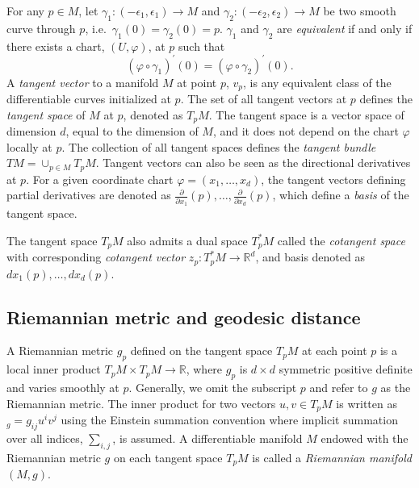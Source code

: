 \documentclass[11pt,a4paper,]{article}
\begin{document}
For any \(p \in M\), let
\(\gamma_1: (-\epsilon_1, \epsilon_1)\rightarrow M\) and
\(\gamma_2: (-\epsilon_2, \epsilon_2)\rightarrow M\) be two smooth curve
through \(p\), i.e.~\(\gamma_1(0) = \gamma_2(0) = p\). \(\gamma_1\) and
\(\gamma_2\) are \emph{equivalent} if and only if there exists a chart,
\((U,\varphi)\), at \(p\) such that \[
(\varphi \circ \gamma_1)^\prime(0) = (\varphi \circ \gamma_2)^\prime(0).
\] A \emph{tangent vector} to a manifold \(M\) at point \(p\), \(v_p\), is any
equivalent class of the differentiable curves initialized at \(p\). The
set of all tangent vectors at \(p\) defines the \emph{tangent space} of \(M\) at
\(p\), denoted as \(T_pM\). The tangent space is a vector space of dimension
\(d\), equal to the dimension of \(M\), and it does not depend on the chart
\(\varphi\) locally at \(p\). The collection of all tangent spaces defines
the \emph{tangent bundle} \(TM = \cup_{p \in M}T_pM\). Tangent vectors can also
be seen as the directional derivatives at \(p\). For a given coordinate
chart \(\varphi=(x_1,\dots,x_d)\), the tangent vectors defining partial
derivatives are denoted as
\(\frac{\partial}{\partial x_1}(p),\dots,\frac{\partial}{\partial x_d}(p)\),
which define a \emph{basis} of the tangent space.

The tangent space \(T_pM\) also admits a dual space \(T^*_pM\) called the
\emph{cotangent space} with corresponding \emph{cotangent vector}
\(z_p: T^*_pM \rightarrow \mathbb{R}^d\), and basis denoted as
\(dx_1(p),\dots,dx_d(p)\).

\hypertarget{riemannian-metric-and-geodesic-distance}{%
\subsection{Riemannian metric and geodesic distance}\label{riemannian-metric-and-geodesic-distance}}

A Riemannian metric \(g_p\) defined on the tangent space \(T_pM\) at each
point \(p\) is a local inner product
\(T_pM \times T_pM \rightarrow \mathbb{R}\), where \(g_p\) is \(d\times d\)
symmetric positive definite and varies smoothly at \(p\). Generally, we
omit the subscript \(p\) and refer to \(g\) as the Riemannian metric. The
inner product for two vectors \(u, v \in T_pM\) is written as
\(<u, v>_g = g_{ij}u^iv^j\) using the Einstein summation convention where
implicit summation over all indices, \(\sum_{i,j}\), is assumed. A
differentiable manifold \(M\) endowed with the Riemannian metric \(g\) on
each tangent space \(T_pM\) is called a \emph{Riemannian manifold} \((M,g)\).
\end{document}
